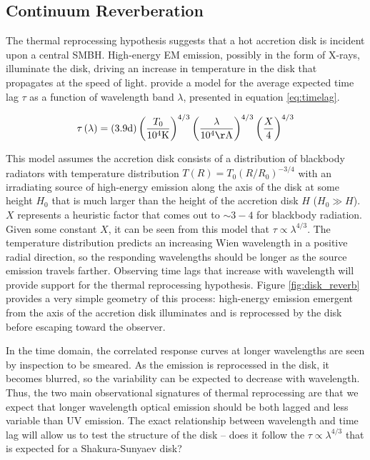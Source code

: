 \documentclass[11pt,letterpaper]{article}
\begin{document}
    \subsection{Continuum Reverberation}
    \label{sec:cont_reverb}
    
    The thermal reprocessing hypothesis suggests that a hot accretion disk is incident upon a central SMBH. High-energy EM emission, possibly in the form of X-rays, illuminate the disk, driving an increase in temperature in the disk that propagates at the speed of light. \cite{1999MNRAS.302L..24C} provide a model for the average expected time lag $\tau$ as a function of wavelength band $\lambda$, presented in equation \ref{eq:timelag}.

    \begin{equation}
        \label{eq:timelag}
        \tau\left(\lambda\right) = 
            \left(3.9 \textrm{d}\right) 
            \left(\frac{T_0}{10^4\mathrm{K}}\right)^{4/3}
            \left(\frac{\lambda}{10^4\mathrm{\AA}}\right)^{4/3}
            \left(\frac{X}{4}\right)^{4/3}
    \end{equation}

    This model assumes the accretion disk consists of a distribution of blackbody radiators with temperature distribution $T\left(R\right) = T_0\left(R/R_0\right)^{-3/4}$ with an irradiating source of high-energy emission along the axis of the disk at some height $H_0$ that is much larger than the height of the accretion disk $H$ ($H_0 \gg H$). $X$ represents a heuristic factor that comes out to $\sim3-4$ for blackbody radiation. Given some constant $X$, it can be seen from this model that $\tau \propto \lambda^{4/3}$. The temperature distribution predicts an increasing Wien wavelength in a positive radial direction, so the responding wavelengths should be longer as the source emission travels farther. Observing time lags that increase with wavelength will provide support for the thermal reprocessing hypothesis. Figure \ref{fig:disk_reverb} provides a very simple geometry of this process: high-energy emission emergent from the axis of the accretion disk illuminates and is reprocessed by the disk before escaping toward the observer.

    In the time domain, the correlated response curves at longer wavelengths are seen by inspection to be smeared. As the emission is reprocessed in the disk, it becomes blurred, so the variability can be expected to decrease with wavelength. Thus, the two main observational signatures of thermal reprocessing are that we expect that longer wavelength optical emission should be both lagged and less variable than UV emission. The exact relationship between wavelength and time lag will allow us to test the structure of the disk -- does it follow the $\tau \propto \lambda^{4/3}$ that is expected for a Shakura-Sunyaev disk?
\end{document}
